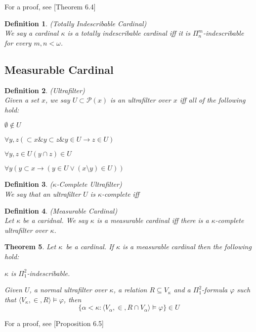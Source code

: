 \documentclass[12pt,a4paper]{article}
\newtheorem{theorem}{Theorem}[section]
\newtheorem{definition}[theorem]{Definition}
\newcommand{\power}[1]{\ensuremath{\mathscr{P}} (#1)}
\newcommand{\then}{\rightarrow}
\newcommand{\bce}{\begin{compactenum}}
\newcommand{\ece}{\end{compactenum}}
\newcommand{\et}{\mathrel{\&}}
\begin{document}
For a proof, see \cite{KanamoriBook}[Theorem 6.4]

\begin{definition}{(Totally Indescribable Cardinal)}\label{def:totally_indescribable_cardinal}\\
We say a cardinal $\kappa$ is a \emph{totally indescribable cardinal} iff it is $\Pi^m_n$-indescribable for every $m, n < \omega$.
\end{definition}

\subsection{Measurable Cardinal}

\begin{definition}{(Ultrafilter)}\\
Given a set $x$, we say $U \subset \power{x}$ is an \emph{ultrafilter} over $x$ iff all of the following hold:
\bce[(i)]
\item $\emptyset \not\in U$
\item $\forall y, z (\subset x \et y \subset z \et y \in U \then z \in U)$
\item $\forall y, z \in U (y \cap z) \in U$
\item $\forall y (y \subset x \then (y \in U \lor (x \setminus y) \in U))$
\ece
\end{definition}

\begin{definition}{($\kappa$-Complete Ultrafilter)}\\
We say that an ultrafilter $U$ is $\kappa$-complete iff
\end{definition}

\begin{definition}{(Measurable Cardinal)}\\
Let $\kappa$ be a caridnal. We say $\kappa$ is a \emph{measurable cardinal} iff there is a $\kappa$-complete ultrafilter over $\kappa$.
\end{definition}

\begin{theorem}
Let $\kappa$ be a cardinal. If $\kappa$ is a measurable cardinal then the following hold:
\bce[(i)]
\item $\kappa$ is $\Pi^2_1$-indescribable.
\item Given $U$, a normal ultrafilter over $\kappa$, a relation $R \subseteq V_\kappa$ and a $\Pi^2_1$-formula $\varphi$ such that $\langle V_\kappa, \in, R \rangle \models \varphi$, then
\begin{equation}
\{ \alpha < \kappa : \langle V_\alpha, \in, R \cap V_\alpha \rangle \models \varphi \} \in U
\end{equation}
\ece
\end{theorem}
For a proof, see \cite{KanamoriBook}[Proposition 6.5]
\end{document}

